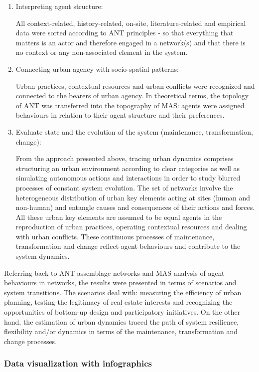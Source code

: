\documentclass[11pt]{report}
\begin{document}
\begin{enumerate}
\item Interpreting agent structure:

All context-related, history-related, on-site, literature-related and empirical data were sorted according to ANT principles - so that everything that matters is an actor and therefore engaged in a network(s) and that there is no context or any non-associated element in the system. 

\item Connecting urban agency with socio-spatial patterns:

Urban practices, contextual resources and urban conflicts were recognized and connected to the bearers of urban agency. In theoretical terms, the topology of ANT was transferred into the topography of MAS: agents were assigned behaviours in relation to their agent structure and their preferences.

\item Evaluate state and the evolution of the system (maintenance, transformation, change):

From the approach presented above, tracing urban dynamics comprises structuring an urban environment according to clear categories as well as simulating autonomous actions and interactions in order to study blurred processes of constant system evolution. The set of networks involve the heterogeneous distribution of urban key elements acting at sites (human and non-human) and entangle causes and consequences of their actions and forces.  All these urban key elements are assumed to be equal agents in the reproduction of urban practices, operating contextual resources and dealing with urban conflicts.  These continuous processes of maintenance, transformation and change reflect agent behaviours and contribute to the system dynamics.
\end{enumerate}

Referring back to ANT assemblage networks and MAS analysis of agent behaviours in networks, the results were presented in terms of scenarios and system transitions. The scenarios deal with: measuring the efficiency of urban planning, testing the legitimacy of real estate interests and recognizing the opportunities of bottom-up design and participatory initiatives. On the other hand, the estimation of urban dynamics traced the path of system resilience, flexibility and/or dynamics in terms of the maintenance, transformation and change processes.


\subsubsection{Data visualization with infographics}
\end{document}
